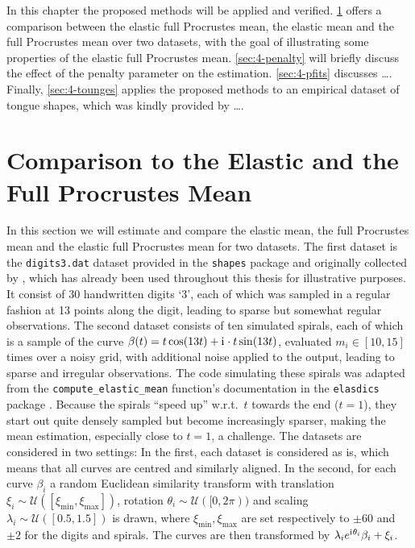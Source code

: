 \label{sec:4}
In this chapter the proposed methods will be applied and verified.
\cref{sec:4-means} offers a comparison between the elastic full Procrustes mean, the elastic mean and the full Procrustes mean over two datasets, with the goal of illustrating some properties of the elastic full Procrustes mean.
\cref{sec:4-penalty} will briefly discuss the effect of the penalty parameter on the estimation.
\cref{sec:4-pfits} discusses \dots .
Finally, \cref{sec:4-tounges} applies the proposed methods to an empirical dataset of tongue shapes, which was kindly provided by \dots.


\section{Comparison to the Elastic and the Full Procrustes Mean}
\label{sec:4-means}
In this section we will estimate and compare the elastic mean, the full Procrustes mean and the elastic full Procrustes mean for two datasets.
The first dataset is the \texttt{digits3.dat} dataset provided in the \texttt{shapes} package \parencite{shapes} and originally collected by \cite{Anderson1997}, which has already been used throughout this thesis for illustrative purposes.
It consist of 30 handwritten digits \enquote*{3}, each of which was sampled in a regular fashion at 13 points along the digit, leading to sparse but somewhat regular observations.
The second dataset consists of ten simulated spirals, each of which is a sample of the curve $\beta(t) = t \cos(13t) + \mathrm{i}\mkern1mu \cdot t \sin(13t)$, evaluated $m_i \in [10,15]$ times over a noisy grid, with additional noise applied to the output, leading to sparse and irregular observations.
The code simulating these spirals was adapted from the \texttt{compute\_elastic\_mean} function's documentation in the \texttt{elasdics} package \parencite{elasdics}.
Because the spirals \enquote{speed up} w.r.t.\ $t$ towards the end ($t = 1$), they start out quite densely sampled but become increasingly sparser, making the mean estimation, especially close to $t=1$, a challenge.
The datasets are considered in two settings:
In the first, each dataset is considered as is, which means that all curves are centred and similarly aligned.
In the second, for each curve $\beta_i$ a random Euclidean similarity transform with translation $\xi_i \sim \mathcal{U}([\xi_\mathrm{min}, \xi_\mathrm{max}])$, rotation $\theta_i \sim \mathcal{U}([0,2\pi))$ and scaling $\lambda_i \sim \mathcal{U}([0.5,1.5])$ is drawn, where $\xi_\mathrm{min}, \xi_\mathrm{max}$ are set respectively to $\pm 60$ and $\pm 2$ for the digits and spirals.
The curves are then transformed by $\lambda_i e^{\mathrm{i}\mkern1mu \theta_i} \beta_i + \xi_i$.

